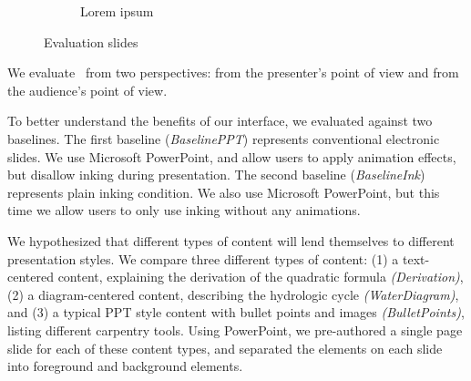 \begin{figure}[t!]
\begin{subfigure}[t]{0.48\columnwidth}
        \caption{Lorem ipsum}
    \end{subfigure}  
    \caption{Evaluation slides}
\end{figure}

We evaluate \interface\ from two perspectives: from the presenter's point of view and from the audience's point of view. 


To better understand the benefits of our interface, we evaluated \interface against two baselines. The first baseline (\textit{BaselinePPT}) represents conventional electronic slides. We use Microsoft PowerPoint, and allow users to apply animation effects, but disallow inking during presentation. The second baseline (\textit{BaselineInk}) represents plain inking condition. We also use Microsoft PowerPoint, but this time we allow users to only use inking without any animations. 

We hypothesized that different types of content will lend themselves to different presentation styles. We compare three different types of content: (1) a text-centered content, explaining the derivation of the quadratic formula \textit{(Derivation)}, (2) a diagram-centered content, describing the hydrologic cycle  \textit{(WaterDiagram)}, and (3) a typical PPT style content with bullet points and images  \textit{(BulletPoints)}, listing different carpentry tools. Using PowerPoint, we pre-authored a single page slide for each of these content types, and separated the elements on each slide into foreground and background elements.  

